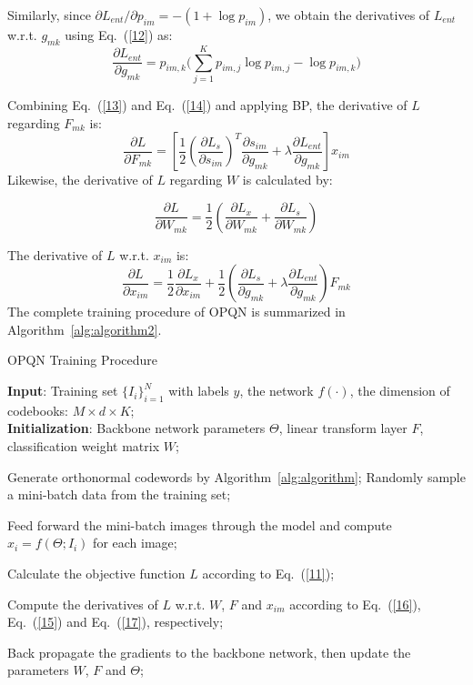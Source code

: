 \documentclass{elsarticle}
\begin{document}
Similarly, since $\partial L_{ent} / \partial p_{im} =-(1+\log{p_{im}})$, we obtain the derivatives of $L_{ent}$ w.r.t. $g_{mk}$ using Eq.~(\ref{12}) as:
\begin{equation} \label{14}
  \frac{\partial L_{ent}}{\partial g_{mk}} = p_{im,k} \Big (\sum_{j=1}^{K} p_{im,j}\log{p_{im,j}} - \log{p_{im,k}} \Big)
\end{equation}

Combining Eq.~(\ref{13}) and Eq.~(\ref{14}) and applying BP, the derivative of $L$ regarding $F_{mk}$ is:
\begin{equation} \label{15}
   \frac{\partial L}{\partial F_{mk}} = \left [ \frac{1}{2}\left (\frac{\partial L_{s}}{\partial s_{im}} \right)^T \frac{\partial s_{im}}{\partial g_{mk}} + 
   \lambda \frac{\partial L_{ent}}{\partial g_{mk}}\right ] x_{im}
\end{equation}
Likewise, the derivative of $L$ regarding $W$ is calculated by:

\begin{equation} \label{16}
   \frac{\partial L}{\partial W_{mk}} = \frac{1}{2}\left (\frac{\partial L_{x}}{\partial W_{mk}} + 
   \frac{\partial L_{s}}{\partial W_{mk}}
   \right )
\end{equation}

The derivative of $L$ w.r.t. $x_{im}$ is:
\begin{equation} \label{17}
   \frac{\partial L}{\partial x_{im}} = \frac{1}{2} \frac{\partial L_{x}}{\partial x_{im}} + \frac{1}{2}\left (\frac{\partial L_{s}}{\partial g_{mk}} + \lambda 
   \frac{\partial L_{ent}}{\partial g_{mk}}
   \right ) F_{mk}
\end{equation}
The complete training procedure of OPQN is summarized in Algorithm~\ref{alg:algorithm2}. 

{\linespread{1.3}
\begin{algorithm}[htbp]
\caption{OPQN Training Procedure}
\label{alg:algorithm2}
\textbf{Input}: Training set $\{I_{i}\}_{i=1}^N$ with labels $y$, the network $f(\cdot)$, the dimension of codebooks: $M\times d \times K$;\\
\textbf{Initialization}: Backbone network parameters $\Theta$, linear transform layer $F$, classification weight matrix $W$;

\begin{algorithmic}[1]
\State Generate orthonormal codewords by Algorithm~\ref{alg:algorithm};
\Repeat
\State Randomly sample a mini-batch data from the training set;
\State \parbox[t]{310pt}{Feed forward the mini-batch images through the model and compute $x_{i}=f(\Theta;I_{i})$ for each image;\strut}
\State Calculate the objective function $L$ according to Eq.~(\ref{11});
\State \parbox[t]{310pt}{Compute the derivatives of $L$ w.r.t. $W$, $F$ and $x_{im}$ according to Eq.~(\ref{16}), Eq.~(\ref{15}) and Eq.~(\ref{17}), respectively;\strut}
\State \parbox[t]{310pt}{Back propagate the gradients to the backbone network, then update the parameters $W$, $F$ and $\Theta$;\strut}
\end{algorithmic}
\end{algorithm}
}
\end{document}
